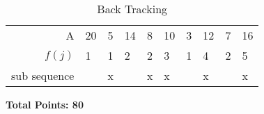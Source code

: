 \documentclass[11pt]{article}
\begin{document}
\begin{enumerate}
\begin{table}[H]
\centering
\begin{tabular}{r|lllllllll}
A            & 20 & 5 & 14 & 8 & 10 & 3 & 12 & 7 & 16 \\
$f(j)$       & 1  & 1 & 2  & 2 & 3  & 1 & 4  & 2 & 5  \\
sub sequence &    & x &    & x & x  &   & x  &   & x
\end{tabular}
\caption{Back Tracking}
\label{tab:back-track}
\end{table}

\end{enumerate}


{\bf Total Points: 80}
\end{document}
